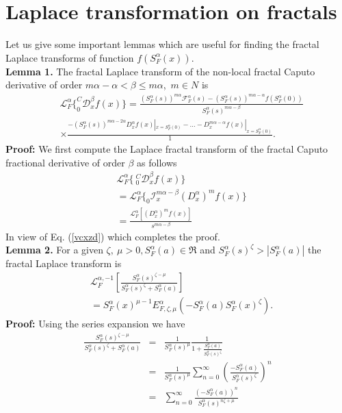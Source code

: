 \documentclass[12pt]{article}
\begin{document}
\section{Laplace transformation on fractals \label{4-sec}}
Let us give some important lemmas  which are useful for finding the fractal Laplace transforms of function $f( S_{F}^{\alpha}(x))$.\\
\textbf{Lemma 1.} The fractal Laplace transform of the non-local  fractal Caputo derivative of order $m \alpha- \alpha<\beta\leq m\alpha$,~$m\in N$ is
\begin{align}\label{poi78}
 & \mathcal{L}_{F}^{\alpha}\{  _{0}^{C}\mathcal{D}_{x}^{\beta}f(x) \}=\frac{(S_{F}^{\alpha}(s))^{m \alpha}\mathcal{F}_{F}^{\alpha}(s)-(S_{F}^{\alpha}(s))^{m \alpha-\alpha}f(S_{F}^{\alpha}(0))}{S_{F}^{\alpha}(s)^{m\alpha-\beta}}\nonumber\\&
 \times \frac{-(S_{F}^{\alpha}(s))^{m \alpha-2 \alpha} D_{x}^{\alpha}f(x)|_{x=S_{F}^{\alpha}(0)}-\ldots - D_{x}^{m \alpha-\alpha}f(x)|_{x=S_{F}^{\alpha}(0)}}{1}.
\end{align}
\textbf{Proof:} We first compute the Laplace fractal transform of the fractal Caputo fractional derivative of order $\beta$ as follows
\begin{align}\label{bv}
  &\mathcal{L}_{F}^{\alpha}\{~_{0}^{C}\mathcal{D}_{x}^{\beta}f(x) \}\nonumber\\&=\mathcal{L}_{F}^{\alpha}\{_{0}\mathcal{I}_{x}^{m \alpha-\beta}  (D_{x}^{\alpha})^{m}f(x) \}\nonumber\\&=\frac{\mathcal{L}_{F}^{\alpha}[ (D_{x}^{\alpha})^{m}f(x)]}{s^{m\alpha-\beta}}
\end{align}
In view of Eq. (\ref{vcxzd}) which completes the proof.\\
\textbf{Lemma 2.} For a given $\zeta,~\mu>0,  S_{F}^{\alpha}(a)\in \Re$ and $S_{F}^{\alpha}(s)^{\zeta}> |S_{F}^{\alpha}(a)|$ the fractal Laplace transform is
\begin{align}\label{g895raws}
  & \mathcal{L}_{F}^{\alpha,-1}\left[\frac{S_{F}^{\alpha}(s)^{\zeta-\mu}}{S_{F}^{\alpha}(s)^{\zeta}+S_{F}^{\alpha}(a)}\right]\nonumber\\&=
   S_{F}^{\alpha}(x)^{\mu-1}E_{F,\zeta,\mu}^{\alpha}(-S_{F}^{\alpha}(a)S_{F}^{\alpha}(x)^{\zeta}).
 \end{align}
\textbf{Proof:} Using the series expansion we have
 \begin{eqnarray}\label{147}
 \frac{S_{F}^{\alpha}(s)^{\zeta-\mu}}{S_{F}^{\alpha}(s)^{\zeta}+S_{F}^{\alpha}(a)}&=&\frac{1}{S_{F}^{\alpha}(s)^{\mu}}
 \frac{1}{1+\frac{S_{F}^{\alpha}(a)}{S_{F}^{\alpha}(s)^{\zeta}}}\\ &=&\frac{1}{S_{F}^{\alpha}(s)^{\mu}}\sum_{n=0}^{\infty}
 \left(\frac{-S_{F}^{\alpha}(a)}{S_{F}^{\alpha}(s)^{\zeta}}\right)^n \nonumber\\
 &=&\sum_{n=0}^{\infty}
 \frac{(-S_{F}^{\alpha}(a))^n}{S_{F}^{\alpha}(s)^{n\zeta+\mu}}
 \end{eqnarray}
\end{document}
